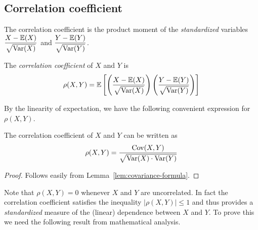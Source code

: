 \subsection{Correlation coefficient}
The correlation coefficient is the product moment of the \emph{standardized} variables $\displaystyle\frac{X-\mathbb{E}(X)}{\sqrt{\text{Var}(X)}}$ and $\displaystyle\frac{Y-\mathbb{E}(Y)}{\sqrt{\text{Var}(Y)}}$.

\begin{definition}\label{def:correlation_coefficient}
The \emph{correlation coefficient} of $X$ and $Y$ is 
\[
\rho(X,Y) = \mathbb{E}\left[\left(\frac{X-\mathbb{E}(X)}{\sqrt{\text{Var}(X)}}\right)\left(\frac{Y-\mathbb{E}(Y)}{\sqrt{\text{Var}(Y)}}\right)\right]
\]
\end{definition}

By the linearity of expectation, we have the following convenient expression for $\rho(X,Y)$.
\begin{lemma}
The correlation coefficient of $X$ and $Y$ can be written as
\[
\rho(X,Y) = \frac{\text{Cov}(X,Y)}{\sqrt{\text{Var}(X)\cdot\text{Var}(Y)}}
\]
\end{lemma}
\begin{proof}
Follows easily from Lemma~\ref{lem:covariance-formula}.
\end{proof}

Note that $\rho(X,Y)=0$ whenever $X$ and $Y$ are uncorrelated. In fact the correlation coefficient satisfies the inequality $|\rho(X,Y)|\leq 1$ and thus provides a \emph{standardized} measure of the (linear) dependence between $X$ and $Y$. To prove this we need the following result from mathematical analysis.%


